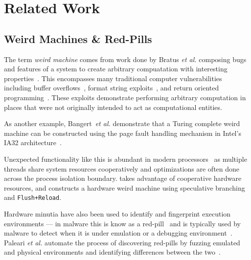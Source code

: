 
\section{Related Work}
\label{sec:related-work}


\subsection{Weird Machines \& Red-Pills}


The term \textit{weird machine} comes from work done by Bratus \textit{et al.}
composing bugs and features of a system to create arbitrary compuatation with
interesting properties~\cite{weird_machines,bratus2011exploit,weird_exploits}.
This encompasses many traditional computer vulnerabilities including buffer
overflows~\cite{buffer_overflow}, format string
exploits~\cite{format_string_exploit}, and return oriented
programming~\cite{shacham2007geometry}. These exploits demonstrate performing
arbitrary computation in places that were not originally intended to act as
computational entities.

As another example, Bangert~\textit{et al.} demonstrate that a Turing complete
weird machine can be constructed using the page fault handling mechanism in
Intel's IA32 architecture~\cite{bangert2013page}. 

Unexpected functionality like this is abundant in modern
processors~\cite{d2015exploiting} as multiple threads share system resources
cooperatively and optimizations are often done across the process
isolation boundary. \speculake takes advantage of cooperative hardware
resources, and constructs a hardware weird machine
using speculative branching and \texttt{Flush+Reload}.

\smallskip

Hardware minutia have also been used to identify and fingerprint execution
environments --- in malware this is know as a red-pill~\cite{red-pill} and 
is typically used by malware to detect when it is under emulation or
a debugging environment~\cite{lindorfer2011detecting, balzarotti2010efficient}. Paleari
\textit{et al.} automate the process of discovering red-pills by
fuzzing emulated and physical environments and identifying
differences between the two~\cite{paleari2009fistful}.

